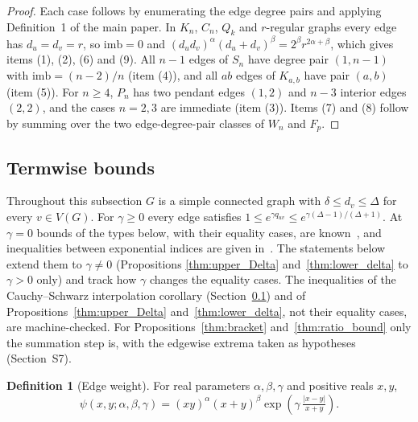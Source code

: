 \documentclass[a5paper, 10pt]{article}
\theoremstyle{plain}
\theoremstyle{remark}
\theoremstyle{definition}
\newtheorem{definition}{Definition}
\newcommand{\edgepsi}{\psi(x,y;\alpha,\beta,\gamma)}
\begin{document}
  \begin{proof}
  Each case follows by enumerating the edge degree pairs and applying
  Definition~1 of the main paper. In $K_n$, $C_n$, $Q_k$ and $r$-regular
  graphs every edge has $d_u = d_v = r$, so $\mathrm{imb} = 0$ and
  $(d_u d_v)^{\alpha}(d_u + d_v)^{\beta} = 2^{\beta} r^{2\alpha + \beta}$,
  which gives items (1), (2), (6) and (9). All $n - 1$ edges of $S_n$
  have degree pair $(1, n - 1)$ with $\mathrm{imb} = (n - 2)/n$
  (item (4)), and all $ab$ edges of $K_{a,b}$ have pair $(a, b)$ (item (5)).
  For $n \ge 4$, $P_n$ has two pendant edges $(1, 2)$ and $n - 3$ interior
  edges $(2, 2)$, and the cases $n = 2, 3$ are immediate (item (3)).
  Items (7) and (8) follow by summing over the two edge-degree-pair
  classes of $W_n$ and $F_p$.
  \end{proof}

\subsection{Termwise bounds}\label{sec:termwise}
  Throughout this subsection $G$ is a simple connected graph with
  $\delta \le d_v \le \Delta$ for every $v \in V(G)$. For $\gamma \ge 0$
  every edge satisfies
  $1 \le e^{\gamma q_{uv}} \le e^{\gamma(\Delta-1)/(\Delta+1)}$. At
  $\gamma = 0$ bounds of the types below, with their equality cases, are
  known~\cite{MolinaSigarreta2025GM, GranadosJMC2025GM, PortillaJMC2025GM}, and inequalities between exponential indices are given in~\cite{CarballosaQuintanaRodriguezSigarreta2023}.
  The statements below extend them to $\gamma \ne 0$ (Propositions
  \ref{thm:upper_Delta} and~\ref{thm:lower_delta} to $\gamma > 0$ only)
  and track how $\gamma$ changes the equality cases. The inequalities
  of the Cauchy--Schwarz interpolation corollary
  (Section~\ref{sec:termwise}) and of Propositions~\ref{thm:upper_Delta} and~\ref{thm:lower_delta}, not
  their equality cases, are machine-checked. For
  Propositions~\ref{thm:bracket} and~\ref{thm:ratio_bound} only the
  summation step is, with the edgewise extrema taken as hypotheses
  (Section~S7).

  \begin{definition}[Edge weight]\label{def:psi}
  For real parameters $\alpha, \beta, \gamma$ and positive reals
  $x, y$,
  \begin{equation}\label{eq:psi}
  \edgepsi = (xy)^{\alpha}(x + y)^{\beta}
  \exp\!\left(\gamma\,\tfrac{|x - y|}{x + y}\right).
  \end{equation}
  \end{definition}
\end{document}
